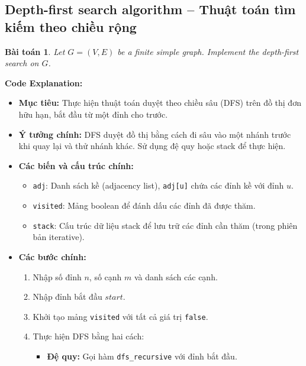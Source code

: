 \documentclass{article}
\newtheorem{baitoan}{Bài toán}
\begin{document}

\subsection{Depth-first search algorithm -- Thuật toán tìm kiếm theo chiều rộng}

\begin{baitoan}
    Let $G = (V,E)$ be a finite simple graph. Implement the depth-first search on $G$.
\end{baitoan}


\textbf{Code Explanation:}

\begin{itemize}
    \item \textbf{Mục tiêu:} Thực hiện thuật toán duyệt theo chiều sâu (DFS) trên đồ thị đơn hữu hạn, bắt đầu từ một đỉnh cho trước.
    \item \textbf{Ý tưởng chính:} DFS duyệt đồ thị bằng cách đi sâu vào một nhánh trước khi quay lại và thử nhánh khác. Sử dụng đệ quy hoặc stack để thực hiện.
    \item \textbf{Các biến và cấu trúc chính:}
    \begin{itemize}
        \item \texttt{adj}: Danh sách kề (adjacency list), \texttt{adj[u]} chứa các đỉnh kề với đỉnh $u$.
        \item \texttt{visited}: Mảng boolean để đánh dấu các đỉnh đã được thăm.
        \item \texttt{stack}: Cấu trúc dữ liệu stack để lưu trữ các đỉnh cần thăm (trong phiên bản iterative).
    \end{itemize}
    \item \textbf{Các bước chính:}
    \begin{enumerate}
        \item Nhập số đỉnh $n$, số cạnh $m$ và danh sách các cạnh.
        \item Nhập đỉnh bắt đầu $start$.
        \item Khởi tạo mảng \texttt{visited} với tất cả giá trị \texttt{false}.
        \item Thực hiện DFS bằng hai cách:
        \begin{itemize}
            \item \textbf{Đệ quy:} Gọi hàm \texttt{dfs\_recursive} với đỉnh bắt đầu.

\end{itemize}
\end{enumerate}
\end{itemize}
\end{document}
